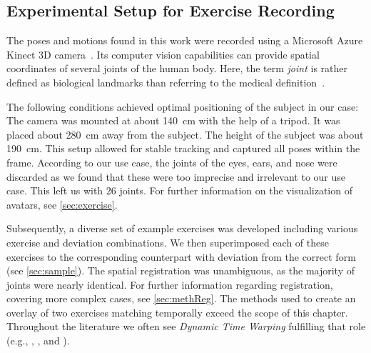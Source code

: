 \subsection{Experimental Setup for Exercise Recording\label{sec:recording}}
The poses and motions found in this work were recorded using a Microsoft Azure Kinect 3D camera~\cite{kinect:documentation}. Its computer vision capabilities can provide spatial coordinates of several joints of the human body. Here, the term \emph{joint} is rather defined as biological landmarks than referring to the medical definition~\cite{kinect:documentation}.

The following conditions achieved optimal positioning of the subject in our case: The camera was mounted at about 140~cm with the help of a tripod. It was placed about 280~cm away from the subject. The height of the subject was about 190~cm. This setup allowed for stable tracking and captured all poses within the frame. According to our use case, the joints of the eyes, ears, and nose were discarded as we found that these were too imprecise and irrelevant to our use case. This left us with 26 joints. For further information on the visualization of avatars, see \autoref{sec:exercise}.

Subsequently, a diverse set of example exercises was developed including various exercise and deviation combinations. We then superimposed each of these exercises to the corresponding counterpart with deviation from the correct form (see \autoref{sec:sample}). The spatial registration was unambiguous, as the majority of joints were nearly identical. For further information regarding registration, covering more complex cases, see \autoref{sec:methReg}. The methods used to create an overlay of two exercises matching temporally exceed the scope of this chapter. Throughout the literature we often see \emph{Dynamic Time Warping} fulfilling that role (e.g., \cite{su2013pre}, \cite{anton2015pre}, and \cite{saenz2016kbv}).


